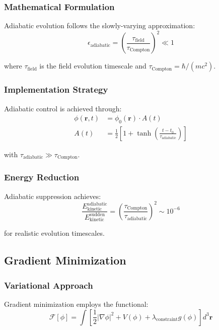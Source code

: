 \subsubsection{Mathematical Formulation}

Adiabatic evolution follows the slowly-varying approximation:
\begin{equation}
\epsilon_{\text{adiabatic}} = \left(\frac{\tau_{\text{field}}}{\tau_{\text{Compton}}}\right)^2 \ll 1
\end{equation}

where $\tau_{\text{field}}$ is the field evolution timescale and $\tau_{\text{Compton}} = \hbar/(mc^2)$.

\subsubsection{Implementation Strategy}

Adiabatic control is achieved through:
\begin{align}
\phi(\mathbf{r}, t) &= \phi_0(\mathbf{r}) \cdot A(t) \\
A(t) &= \frac{1}{2}\left[1 + \tanh\left(\frac{t - t_0}{\tau_{\text{adiabatic}}}\right)\right]
\end{align}

with $\tau_{\text{adiabatic}} \gg \tau_{\text{Compton}}$.

\subsubsection{Energy Reduction}

Adiabatic suppression achieves:
\begin{equation}
\frac{E_{\text{kinetic}}^{\text{adiabatic}}}{E_{\text{kinetic}}^{\text{sudden}}} = \left(\frac{\tau_{\text{Compton}}}{\tau_{\text{adiabatic}}}\right)^2 \sim 10^{-6}
\end{equation}

for realistic evolution timescales.

\subsection{Gradient Minimization}

\subsubsection{Variational Approach}

Gradient minimization employs the functional:
\begin{equation}
\mathcal{F}[\phi] = \int \left[\frac{1}{2}|\nabla \phi|^2 + V(\phi) + \lambda_{\text{constraint}} g(\phi)\right] d^3\mathbf{r}
\end{equation}

